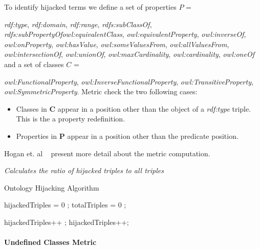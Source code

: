 To identify hijacked terms  we define a set of properties $P$ = {\textit{rdf:type}, \textit{rdf:domain}, \textit{rdf:range}, \textit{rdfs:subClassOf}, \textit{rdfs:subPropertyOf}\textit{owl:equivalentClass}, \textit{owl:equivalentProperty}, \textit{owl:inverseOf}, \textit{owl:onProperty}, \textit{owl:hasValue}, \textit{owl:someValuesFrom}, \textit{owl:allValuesFrom}, \textit{owl:intersectionOf}, \textit{owl:unionOf}, \textit{owl:maxCardinality}, \textit{owl:cardinality}, \textit{owl:oneOf} and a set of classes $C$ = {\textit{owl:FunctionalProperty}, \textit{owl:InverseFunctionalProperty}, \textit{owl:TransitiveProperty}, \textit{owl:SymmetricProperty}.
Metric check the two following cases:
\begin{itemize}
\item Classes in \textbf{C} appear in a position other than the object of a \textit{rdf:type} triple. This is the a property redefinition.
\item Properties in \textbf{P} appear in a position other than the predicate position.
\end{itemize}
Hogan et. al ~\cite{Hogan08} present more detail about the metric computation.

\begin{mdframed}[style=metricdefinition]
\emph{Calculates the ratio of hijacked triples to all triples}
\end{mdframed}


\begin{algorithm}
\caption{Ontology Hijacking Algorithm}\label{lst:undefCl}
\begin{algorithmic}[1]
\State hijackedTriples = 0 ;
\State totalTriples = 0 ;
\EndProcedure

 hijackedTriples++ ;\EndIf
{} hijackedTriples++; \EndIf
{}
\EndProcedure
\end{algorithmic}
\end{algorithm}

\paragraph{Undefined Classes Metric} ~\\ 
\label{par:undefClass}

}}

